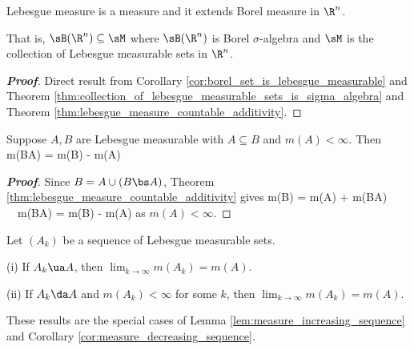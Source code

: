 \begin{corollary}\label{cor:lebesgue_measure_is_measure_extends_borel_measure_in_real_n}
Lebesgue measure is a measure and it extends Borel measure in $\R^n$. 

That is, $\sB(\R^n)\subseteq \sM$ where $\sB(\R^n)$ is Borel $\sigma$-algebra and $\sM$ is the collection of Lebesgue measurable sets in $\R^n$.
\end{corollary}

\begin{proof}[\bf Proof]
Direct result from Corollary \ref{cor:borel_set_is_lebesgue_measurable} and Theorem \ref{thm:collection_of_lebesgue_measurable_sets_is_sigma_algebra} and Theorem \ref{thm:lebesgue_measure_countable_additivity}.
\end{proof}


\begin{corollary}\label{cor:difference_increasing_lebesgue_measurable_sets}
Suppose $A,B$ are Lebesgue measurable with $A\subseteq B$ and $m(A)<\infty$. Then
\be
m(B\bs A) = m(B) - m(A)
\ee
\end{corollary}

\begin{proof}[\bf Proof]
Since $B = A\cup (B\bs A)$, Theorem \ref{thm:lebesgue_measure_countable_additivity} gives
\be
m(B) = m(A) + m(B\bs A) \ \ra\ m(B\bs A) = m(B) - m(A)
\ee
as $m(A)<\infty$.
\end{proof}


\begin{theorem}\label{thm:limit_of_sequence_of_lebesgue_measurable_sets}
Let $(A_k)$ be a sequence of Lebesgue measurable sets. 
\ben
\item [(i)] If $A_k\ua A$, then $\lim_{k\to \infty} m(A_k) = m(A)$.
\item [(ii)] If $A_k\da A$ and $m(A_k) <\infty$ for some $k$, then $\lim_{k\to \infty} m(A_k) = m(A)$.
\een
\end{theorem}

\begin{remark}
These results are the special cases of Lemma \ref{lem:measure_increasing_sequence} and Corollary \ref{cor:measure_decreasing_sequence}.
\end{remark}

